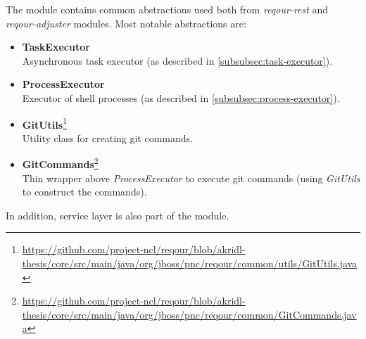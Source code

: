 \documentclass[../main.tex]{subfiles}
\begin{document}
The module contains common abstractions used both from \textit{reqour-rest} and \textit{reqour-adjuster} modules. Most notable abstractions are:
\begin{itemize}
    \item \textbf{TaskExecutor}\\
    Asynchronous task executor (as described in \ref{subsubsec:task-executor}).

    \item \textbf{ProcessExecutor}\\
    Executor of shell processes (as described in \ref{subsubsec:process-executor}).

    \item \textbf{GitUtils}\footnote{\url{https://github.com/project-ncl/reqour/blob/akridl-thesis/core/src/main/java/org/jboss/pnc/reqour/common/utils/GitUtils.java}}\\
    Utility class for creating git commands.

    \item \textbf{GitCommands}\footnote{\url{https://github.com/project-ncl/reqour/blob/akridl-thesis/core/src/main/java/org/jboss/pnc/reqour/common/GitCommands.java}}\\
    Thin wrapper above \textit{ProcessExecutor} to execute git commands (using \textit{GitUtils} to construct the commands).
\end{itemize}

In addition, service layer is also part of the module.
\end{document}
